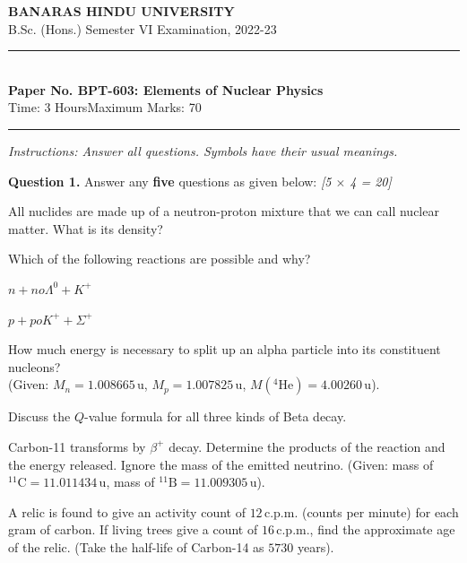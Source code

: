 \documentclass[11pt,a4paper]{article}
\newcommand{\pts}[1]{\hfill   \textit{[#1]}}
\begin{document}
\begin{center}
  {\large\bfseries BANARAS HINDU UNIVERSITY}\\[2pt]
  {\normalsize B.Sc. (Hons.) Semester VI Examination, 2022-23}\\[6pt]
  \rule{0.8\linewidth}{0.5pt}\\[6pt]
  {\large\bfseries Paper No. BPT-603: Elements of Nuclear Physics}\\[4pt]
  {\normalsize Time: 3 Hours\hfill Maximum Marks: 70}
\end{center}
\rule{\linewidth}{0.4pt}
\smallskip



\noindent   \textit{Instructions: Answer all questions. Symbols have their usual meanings.}
\bigskip




\noindent   \textbf{Question 1.} Answer any   \textbf{five} questions as given below: \pts{5 $ \times$ 4 = 20}

\begin{parts}
  \item All nuclides are made up of a neutron-proton mixture that we can call nuclear matter. What is its density?
  \item Which of the following reactions are possible and why?
    
\begin{parts}
      \item $n + n  o \Lambda^0 + K^+$
      \item $p + p  o K^+ + \Sigma^+$
    \end{parts}
  \item How much energy is necessary to split up an alpha particle into its constituent nucleons? \\
    (Given: $M_n = 1.008665\, \text{u}$, $M_p = 1.007825\, \text{u}$, $M(^{4} \text{He}) = 4.00260\, \text{u}$).
  \item Discuss the $Q$-value formula for all three kinds of Beta decay.
  \item Carbon-11 transforms by $\beta^+$ decay. Determine the products of the reaction and the energy released. Ignore the mass of the emitted neutrino. (Given: mass of $^{11} \text{C} = 11.011434\, \text{u}$, mass of $^{11} \text{B} = 11.009305\, \text{u}$).
  \item A relic is found to give an activity count of $12\, \text{c.p.m.}$ (counts per minute) for each gram of carbon. If living trees give a count of $16\, \text{c.p.m.}$, find the approximate age of the relic. (Take the half-life of Carbon-14 as $5730$ years).
\end{parts}
\end{document}
